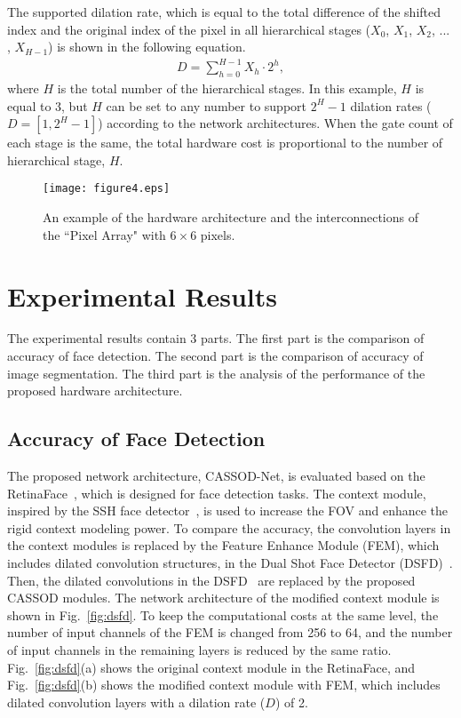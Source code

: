 \documentclass[10pt,twocolumn,letterpaper]{article}
\begin{document}
The supported dilation rate, which is equal to the total difference of the shifted index and the original index of the pixel in all hierarchical stages ($X_{0}$, $X_{1}$, $X_{2}$, ... , $X_{H-1}$) is shown in the following equation.
\begin{eqnarray}
  D=\sum^{H-1}_{h=0} X_{h} \cdot 2^{h},
\label{eq:supported}
\end{eqnarray}
where $H$ is the total number of the hierarchical stages. In this example, $H$ is equal to 3, but $H$ can be set to any number to support $2^H - 1$ dilation rates ($D=[1, 2^{H}-1]$) according to the network architectures. When the gate count of each stage is the same, the total hardware cost is proportional to the number of hierarchical stage, $H$.

\begin{figure*}[t]
\begin{center}
   \texttt{[image: figure4.eps]}\\
\end{center}
   \caption{An example of the hardware architecture and the interconnections of the ``Pixel Array" with $6 \times 6$ pixels.}
\label{fig:shift}
\end{figure*}

\section{Experimental Results}
\label{sec:results}

The experimental results contain 3 parts. The first part is the comparison of accuracy of face detection. The second part is the comparison of accuracy of image segmentation. The third part is the analysis of the performance of the proposed hardware architecture.



\subsection{Accuracy of Face Detection}
\label{subsec:face}

The proposed network architecture, CASSOD-Net, is evaluated based on the RetinaFace~\cite{Deng19}, which is designed for face detection tasks. The context module, inspired by the SSH face detector~\cite{Najibi17}, is used to increase the FOV and enhance the rigid context modeling power. To compare the accuracy, the convolution layers in the context modules is replaced by the Feature Enhance Module (FEM), which  includes dilated convolution structures, in the Dual Shot Face Detector (DSFD)~\cite{Li18_1}. Then, the dilated convolutions in the DSFD~\cite{Wu19} are replaced by the proposed CASSOD modules. The network architecture of the modified context module is shown in Fig.~\ref{fig:dsfd}. To keep the computational costs at the same level, the number of input channels of the FEM is changed from 256 to 64, and the number of input channels in the remaining layers is reduced by the same ratio. Fig.~\ref{fig:dsfd}(a) shows the original context module in the RetinaFace, and Fig.~\ref{fig:dsfd}(b) shows the modified context module with FEM, which includes dilated convolution layers with a dilation rate ($D$) of 2.
\end{document}
